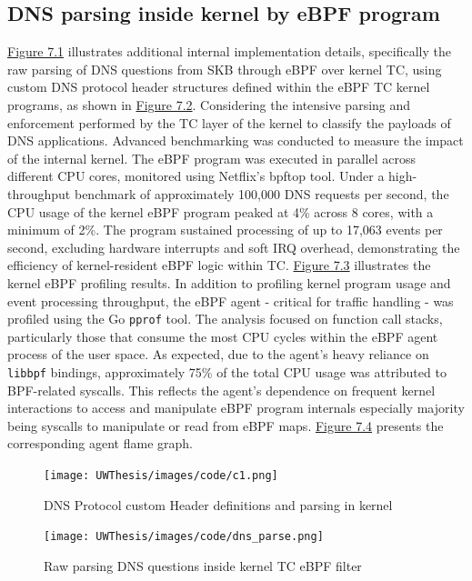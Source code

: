 \documentclass [11pt, proquest] {uwthesis}[2020/02/24]
\begin{document}
\subsection{DNS parsing inside kernel by eBPF  program}
\hyperref[fig:c1]{Figure 7.1} illustrates additional internal implementation details, specifically the raw parsing of DNS questions from SKB through eBPF over kernel TC, using custom DNS protocol header structures defined within the eBPF TC kernel programs, as shown in \hyperref[fig:c2]{Figure 7.2}. Considering the intensive parsing and enforcement performed by the TC layer of the kernel to classify the payloads of DNS applications. Advanced benchmarking was conducted to measure the impact of the internal kernel. The eBPF program was executed in parallel across different CPU cores, monitored using Netflix’s bpftop tool. Under a high-throughput benchmark of approximately 100,000 DNS requests per second, the CPU usage of the kernel eBPF program peaked at 4\% across 8 cores, with a minimum of 2\%. The program sustained processing of up to 17,063 events per second, excluding hardware interrupts and soft IRQ overhead, demonstrating the efficiency of kernel-resident eBPF logic within TC. \hyperref[fig:c3]{Figure 7.3} illustrates the kernel eBPF profiling results. In addition to profiling kernel program usage and event processing throughput, the eBPF agent - critical for traffic handling - was profiled using the Go \texttt{pprof} tool. The analysis focused on function call stacks, particularly those that consume the most CPU cycles within the eBPF agent process of the user space. As expected, due to the agent’s heavy reliance on \texttt{libbpf} bindings, approximately 75\% of the total CPU usage was attributed to BPF-related syscalls. This reflects the agent’s dependence on frequent kernel interactions to access and manipulate eBPF program internals especially majority being syscalls to manipulate or read from eBPF maps. \hyperref[fig:c4]{Figure 7.4} presents the corresponding agent flame graph. 

\begin{figure}
    \centering
  \texttt{[image: UWThesis/images/code/c1.png]}
  \caption{DNS Protocol custom Header definitions and parsing in kernel}
  \label{fig:c1}
\end{figure}


\begin{figure}[H]
    \centering
    \texttt{[image: UWThesis/images/code/dns\_parse.png]}
    \caption{Raw parsing DNS questions inside kernel TC eBPF filter}
    \label{fig:c2}
\end{figure}
\end{document}
